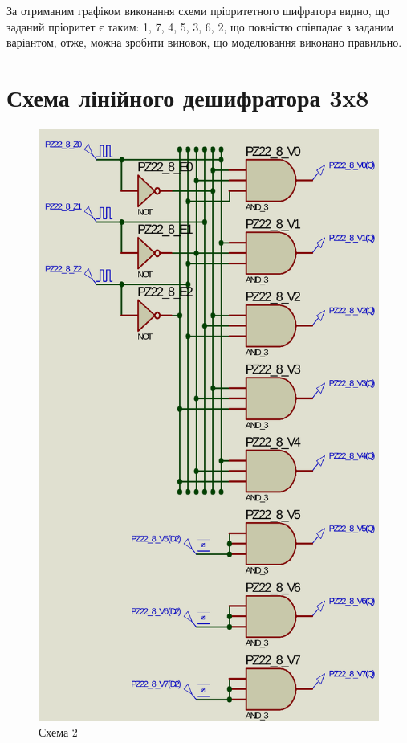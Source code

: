 \documentclass{article}
\begin{document}
\begin{normalsize}
	За отриманим графіком виконання схеми пріоритетного шифратора видно, що заданий пріоритет є таким: 1, 7, 4, 5, 3, 6, 2, що повністю співпадає з заданим варіантом, отже, можна зробити виновок, що моделювання виконано правильно.

	\section*{Схема лінійного дешифратора 3x8}
	\begin{figure}[H]
		\centering
		\includegraphics[scale=0.34]{s2}	
		\caption{Схема 2}
	\end{figure}


\end{normalsize}
\end{document}

